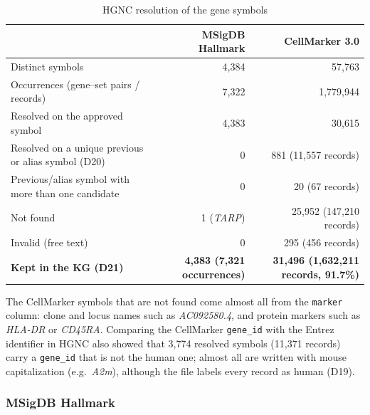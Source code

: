 \begin{table}[htbp]
\centering
\small
\begin{tabularx}{\linewidth}{|X|r|r|}
\hline
 & \textbf{MSigDB Hallmark} & \textbf{CellMarker 3.0} \\ \hline
Distinct symbols & 4,384 & 57,763 \\ \hline
Occurrences (gene--set pairs / records) & 7,322 & 1,779,944 \\ \hline
Resolved on the approved symbol & 4,383 & 30,615 \\ \hline
Resolved on a unique previous or alias symbol (D20) & 0 & 881 (11,557 records) \\ \hline
Previous/alias symbol with more than one candidate & 0 & 20 (67 records) \\ \hline
Not found & 1 (\emph{TARP}) & 25,952 (147,210 records) \\ \hline
Invalid (free text) & 0 & 295 (456 records) \\ \hline
\textbf{Kept in the KG (D21)} & \textbf{4,383 (7,321 occurrences)} & \textbf{31,496 (1,632,211 records, 91.7\%)} \\ \hline
\end{tabularx}
\caption{HGNC resolution of the gene symbols}
\label{tab:hgnc-resolution}
\end{table}

The CellMarker symbols that are not found come almost all from the \texttt{marker} column: clone and locus names such as \emph{AC092580.4}, and protein markers such as \emph{HLA-DR} or \emph{CD45RA}. Comparing the CellMarker \texttt{gene\_id} with the Entrez identifier in HGNC also showed that 3,774 resolved symbols (11,371 records) carry a \texttt{gene\_id} that is not the human one; almost all are written with mouse capitalization (e.g.\ \emph{A2m}), although the file labels every record as human (D19).

\subsubsection{MSigDB Hallmark}

